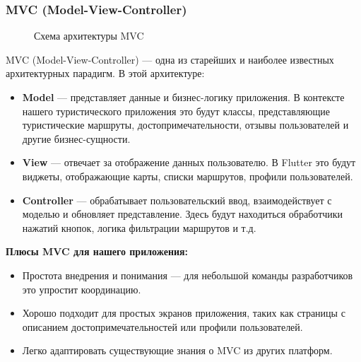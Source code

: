 \subsubsection*{MVC (Model-View-Controller)}

\begin{figure}[H]
\centering
{}
\caption{Схема архитектуры MVC}
\label{fig:mvc}
\end{figure}

MVC (Model-View-Controller) — одна из старейших и наиболее известных архитектурных парадигм. В этой архитектуре:

\begin{itemize}
    \item \textbf{Model} — представляет данные и бизнес-логику приложения. В контексте нашего туристического приложения это будут классы, представляющие туристические маршруты, достопримечательности, отзывы пользователей и другие бизнес-сущности.
    \item \textbf{View} — отвечает за отображение данных пользователю. В Flutter это будут виджеты, отображающие карты, списки маршрутов, профили пользователей.
    \item \textbf{Controller} — обрабатывает пользовательский ввод, взаимодействует с моделью и обновляет представление. Здесь будут находиться обработчики нажатий кнопок, логика фильтрации маршрутов и т.д.
\end{itemize}

\textbf{Плюсы MVC для нашего приложения:}
\begin{itemize}
    \item Простота внедрения и понимания — для небольшой команды разработчиков это упростит координацию.
    \item Хорошо подходит для простых экранов приложения, таких как страницы с описанием достопримечательностей или профили пользователей.
    \item Легко адаптировать существующие знания о MVC из других платформ.
\end{itemize}

